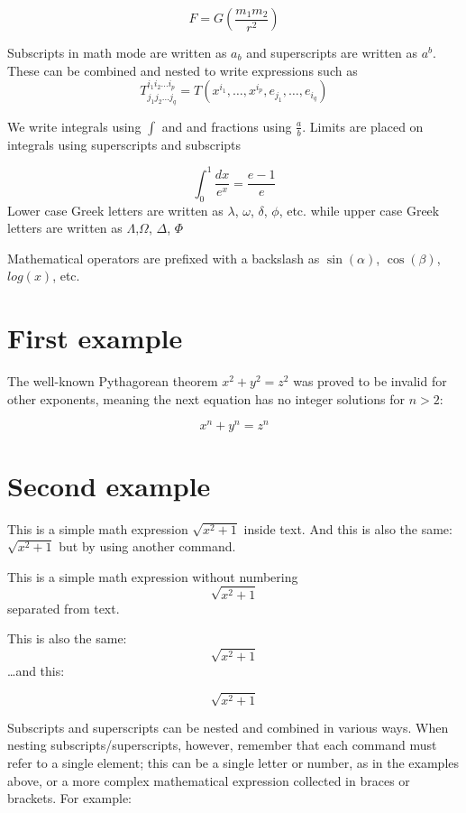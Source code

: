 \documentclass[12pt, letterpaper]{article}
\begin{document}
\[F=G\left(\frac{m_1m_2}{r^2}\right)\]

\newpage
Subscripts in math mode are written as $a_b$  and superscripts are written as $a^b$. These can be combined and nested to write
expressions such as \[T^{i_1 i_2 \dots i_p}_{j_1 j_2 \dots j_q} =
T(x^{i_1},\dots, x^{i_p},e_{j_1},\dots,e_{i_q}) \]

\bigskip 
We write integrals using $\int$ and and fractions using $\frac{a}{b}$. Limits are placed on integrals using superscripts and subscripts

\[\int_{0} ^{1}\frac{dx}{e^{x}} =\frac{e-1}{e} \]
\bigskip
Lower case Greek letters are written as $\lambda$, $\omega$, $\delta$, $\phi$, etc. while upper case Greek letters are written as $\Lambda$,$\Omega$, $\Delta$, $\Phi$

\bigskip
Mathematical operators are prefixed with a backslash as $\sin(\alpha)$, $\cos(\beta)$, $log(x)$, etc.

\newpage
\section{First example}

The well-known Pythagorean theorem \(x^{2}+y^{2}=z^{2}\) was proved to be invalid for other exponents, meaning the next equation has no integer solutions for \(n>2\):

\[x^n+y^n=z^n\]
\section{Second example}
This is a simple math expression \(\sqrt{x^{2}+1}\)  inside text.
And this is also the same: 
\begin{math} 
\sqrt{x^2+1}
\end{math} but by using another command. 

This is a simple math expression without numbering 
\[\sqrt{x^2+1}\] separated from text.


This is also the same:
\begin{displaymath}
\sqrt{x^2+1}
\end{displaymath}
\ldots and this:

\begin{equation*}
\sqrt{x^2+1}    
\end{equation*}


Subscripts and superscripts can be nested and combined in various ways. When nesting subscripts/superscripts, however, remember that each command must refer to a single element; this can be a single letter or number, as in the examples above, or a more complex mathematical expression collected in braces or brackets. For example:
\end{document}
